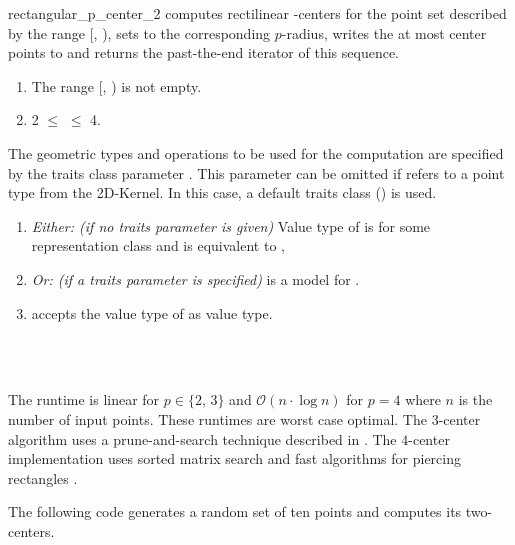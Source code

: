 \begin{ccRefFunction}{rectangular_p_center_2}
  computes rectilinear -centers for the point set described by
  the range [, ), sets  to the corresponding
  $p$-radius, writes the at most  center points to  and
  returns the past-the-end iterator of this sequence.
  
  \ccPrecond
  \begin{enumerate}
  \item The range [, ) is not empty.
  \item 2 $\le$  $\le$ 4.
  \end{enumerate}
  
  The geometric types and operations to be used for the computation
  are specified by the traits class parameter . This parameter
  can be omitted if  refers to a point type from
  the 2D-Kernel. In this case, a default traits class
  () is used.
  
  \ccRequire
  \begin{enumerate}
  \item \textit{Either: (if no traits parameter is given)} Value type
    of  is  for some
    representation class  and  is equivalent to
    ,
  \item \textit{Or: (if a traits parameter is specified)} 
    is a model for .
  \item {} accepts the value type of
     as value type.
  \end{enumerate}  
  
  \ccSeeAlso
  \\
  \\
  
  \ccImplementation The runtime is linear for $p \in \{2,\,3\}$ and
  $\mathcal{O}(n \cdot \log n)$ for $p = 4$ where $n$ is the number of
  input points. These runtimes are worst case optimal. The $3$-center
  algorithm uses a prune-and-search technique described in
  \cite{h-slacr-99}.  The $4$-center implementation uses sorted matrix
  search \cite{fj-fkppc-83,fj-gsrsm-84} and fast algorithms for
  piercing rectangles \cite{sw-rpppp-96}.
  
  \ccExample The following code generates a random set of ten points
  and computes its two-centers.

\end{ccRefFunction}

